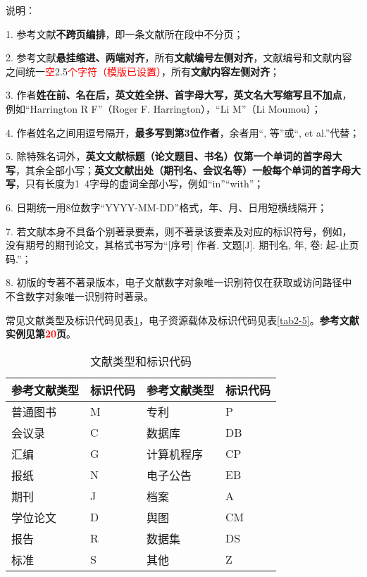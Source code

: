 说明：

1. 参考文献\textbf{不跨页编排}，即一条文献所在段中不分页；

2. 参考文献\textbf{悬挂缩进、两端对齐}，所有\textbf{文献编号左侧对齐}，文献编号和文献内容之间统一\textcolor{red}{空}2.5\textcolor{red}{个字符（模版已设置）}，所有\textbf{文献内容左侧对齐}；

3. 作者\textbf{姓在前、名在后，英文姓全拼、首字母大写，英文名大写缩写且不加点}，例如“Harrington R F”（Roger F. Harrington），“Li M”（Li Moumou）；

4. 作者姓名之间用逗号隔开，\textbf{最多写到第3位作者}，余者用“, 等”或“, et al.”代替；

5. 除特殊名词外，\textbf{英文文献标题（论文题目、书名）仅第一个单词的首字母大写}，其余全部小写；\textbf{英文文献出处（期刊名、会议名等）一般每个单词的首字母大写}，只有长度为1~4字母的虚词全部小写，例如“in”“with”；

6. 日期统一用8位数字“YYYY-MM-DD”格式，年、月、日用短横线隔开；

7. 若文献本身不具备个别著录要素，则不著录该要素及对应的标识符号，例如，没有期号的期刊论文，其格式书写为“[序号] 作者. 文题[J]. 期刊名, 年, 卷: 起-止页码.”；

8. 初版的专著不著录版本，电子文献数字对象唯一识别符仅在获取或访问路径中不含数字对象唯一识别符时著录。

常见文献类型及标识代码见表\ref{tab2-4}，电子资源载体及标识代码见表\ref{tab2-5}。\textbf{参考文献实例见第\textcolor{red}{20}页}。


\begin{table}[!ht]
\centering
\caption{文献类型和标识代码}
\label{tab2-4}
\belowrulesep=0pt %
\aboverulesep=0pt
\begin{tabularx}{\textwidth}{ 
>{\centering\arraybackslash}X 
>{\centering\arraybackslash}X|
>{\centering\arraybackslash}X
>{\centering\arraybackslash}X
}
\toprule
参考文献类型 & 标识代码 & 参考文献类型 & 标识代码 \\
\midrule
普通图书 & M & 专利 & P \\
会议录 & C & 数据库 & DB \\
汇编 & G & 计算机程序 & CP \\
报纸 & N & 电子公告 & EB \\
期刊 & J & 档案 & A \\
学位论文 & D & 舆图 & CM \\
报告 & R & 数据集 & DS \\
标准 & S & 其他 & Z \\
\bottomrule
\end{tabularx}
\end{table}

